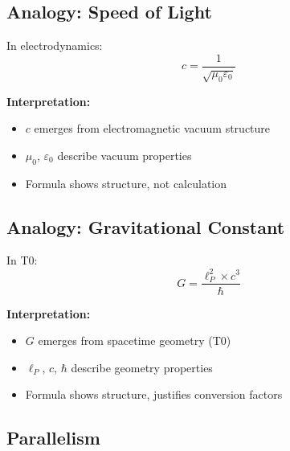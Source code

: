 	\subsection{Analogy: Speed of Light}
	
	In electrodynamics:
	\begin{equation}
		c = \frac{1}{\sqrt{\mu_0 \varepsilon_0}}
	\end{equation}
	
	\textbf{Interpretation:}
	\begin{itemize}
		\item $c$ emerges from electromagnetic vacuum structure
		\item $\mu_0$, $\varepsilon_0$ describe vacuum properties
		\item Formula shows structure, not calculation
	\end{itemize}
	
	\subsection{Analogy: Gravitational Constant}
	
	In T0:
	\begin{equation}
		G = \frac{\ell_P^2 \times c^3}{\hbar}
	\end{equation}
	
	\textbf{Interpretation:}
	\begin{itemize}
		\item $G$ emerges from spacetime geometry (T0)
		\item $\ell_P$, $c$, $\hbar$ describe geometry properties
		\item Formula shows structure, justifies conversion factors
	\end{itemize}
	
	\subsection{Parallelism}
	
	\begin{table}[h]
		\centering
		\caption{Parallel Structures}
	\end{table}
	
